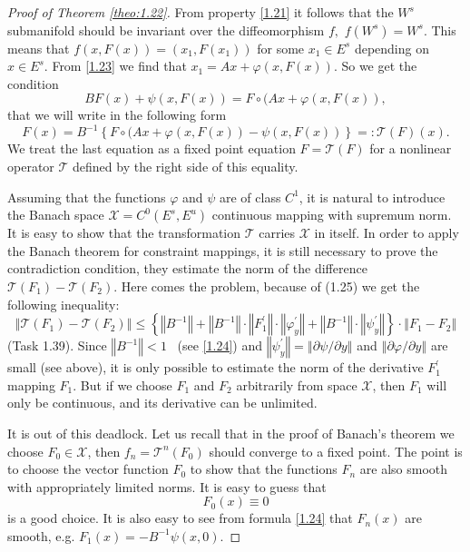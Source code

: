 \begin{proof}[Proof of Theorem \ref{theo:1.22}]
	From property \eqref{1.21} it follows that the $W^{s}$ submanifold should be invariant over the diffeomorphism $f,$ $f(W^{s})=W^{s}.$ This means that $f(x,F(x))=(x_{1},F(x_{1}))$ for some $x_{1}\in E^{s}$ depending on $x\in E^{s}$. From \eqref{1.23} we find that $x_{1}=Ax+\varphi (x,F(x)).$ So we get the condition
	$$
	BF(x)+\psi (x,F(x))=F\circ (Ax+\varphi (x,F(x)),
	$$
	that we will write in the following form
	\begin{equation}
	\label{1.25}
	F(x)=B^{-1}\left\{ F\circ (Ax+\varphi (x,F(x))-\psi (x,F(x))\right\} =:%
	\mathcal{T}(F)(x).
	\end{equation}
	We treat the last equation as a fixed point equation $F=%
	\mathcal{T}(F)$ for a nonlinear operator $\mathcal{T}$ defined by the right side of this equality.
	
	Assuming that the functions $ \varphi $ and $ \psi $ are of class $ C^{1} $, it is natural to introduce the Banach space $ \mathcal {X}%
	= C ^ {0} (E ^ {s}, E ^ {u}) $ continuous mapping with supremum norm. It is easy to show that the transformation $ \mathcal {T} $ carries $ \mathcal {X} $ in itself. In order to apply the Banach theorem for constraint mappings, it is still necessary to prove the contradiction condition, they estimate the norm of the difference $ \mathcal {T} (F_ {1}) - \mathcal {T} (F_ {2})$. Here comes the problem, because of (1.25) we get the following inequality:
	$$
	\left\Vert \mathcal{T}(F_{1})-\mathcal{T}(F_{2})\right\Vert
	\leq \left\{ \left\Vert B^{-1}\right\Vert +\left\Vert B^{-1}\right\Vert
	\cdot \left\Vert F_{1}^{\prime }\right\Vert \cdot \left\Vert \varphi
	_{y}^{\prime }\right\Vert +\left\Vert B^{-1}\right\Vert \cdot \left\Vert
	\psi _{y}^{\prime }\right\Vert \right\} \cdot \left\Vert
	F_{1}-F_{2}\right\Vert
	$$
	(Task 1.39). Since $ \left \Vert B ^ {- 1} \right \Vert <1 $ \ (see \eqref{1.24}) and $\left\Vert \psi _{y}^{\prime }\right\Vert =\left\Vert \partial
	\psi /\partial y\right\Vert $ and $\left\Vert \partial \varphi /\partial
	y\right\Vert $ are small (see above), it is only possible to estimate the norm of the derivative $ F_ {1} ^ {\prime} $ mapping $ F_ {1}$. But if we choose $ F_ {1} $ and $ F_ {2} $ arbitrarily from space $ \mathcal {X}$, then  $ F_ {1} $ will only be continuous, and its derivative can be unlimited.
	
	It is out of this deadlock. Let us recall that in the proof of Banach's theorem we choose $ F_ {0} \in \mathcal {X}$, then $ f_ {n} = \mathcal {T} ^ {n} (F_ {0}) $ should converge to a fixed point. The point is to choose the vector function $ F_ {0} $ to show that the functions $ F_ {n} $ are also smooth with appropriately limited norms. It is easy to guess that
	$$
	F_{0}(x)\equiv 0
	$$
	is a good choice. It is also easy to see from formula \eqref{1.24} that $ F_ {n} (x) $  are smooth, e.g. $F_{1}(x)=-B^{-1}\psi (x,0).$
	

\end{proof}
